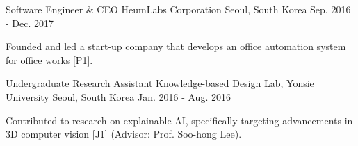 \begin{cventries}
\cventry
{Software Engineer \& CEO} %
{HeumLabs Corporation} %
{Seoul, South Korea} %
{Sep. 2016 - Dec. 2017} %
{ %
\begin{cvitems}
\item {Founded and led a start-up company that develops an office automation system for office works [P1].}
\end{cvitems}
}

\vspace{-.5em}
\cventry
{Undergraduate Research Assistant} %
{Knowledge-based Design Lab, Yonsie University} %
{Seoul, South Korea} %
{Jan. 2016 - Aug. 2016} %
{ %
\begin{cvitems}
\item {Contributed to research on explainable AI, specifically targeting advancements in 3D computer vision [J1] (Advisor: Prof. Soo-hong Lee).}
\end{cvitems}
}



\end{cventries}
